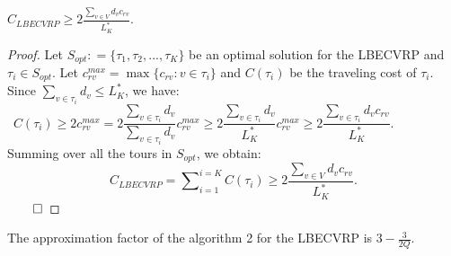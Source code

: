 \begin{lemma}
${C_{LBECVRP}} \ge 2\frac{{\sum\nolimits_{v \in V}^{} d_v c_{rv}}}{L_K^*}.$
\end{lemma}
\begin{proof}
\indent Let $S_{opt}: = \{ \tau _1,\tau _2,...,\tau _K\}$ be an optimal solution for the LBECVRP and $\tau_i \in S_{opt}$. Let $c_{rv}^{max} = \max \{c_{rv}:v \in {\tau_i}\} $ and $C({\tau_i})$ be the traveling cost of $\tau_i$. Since $\sum\nolimits_{v \in \tau_i} d_v \le L_K^*$, we have:
$$C(\tau_i) \ge 2c_{rv}^{max} = 2\frac{{\sum\nolimits_{v \in \tau_i} d_v }}{{\sum\nolimits_{v \in \tau_i} d_v }}c_{rv}^{max} \ge 2\frac{{\sum\nolimits_{v \in \tau_i} d_v }}{L_K^*} c_{rv}^{max} \ge 2\frac{\sum\nolimits_{v \in {\tau_i}} d_v c_{rv} }{L_K^*}.\hspace{2cm}$$
\noindent Summing over all the tours in $S_{opt}$, we obtain:
$${C_{LBECVRP}}=\sum\nolimits_{i=1}^{i=K} C( \tau_i) \ge 2\frac{\sum\nolimits_{v \in V}{d_v c_{rv}} }{L_K^*}. $$
$\qed$
\end{proof}
\begin{theorem}
The approximation factor of the algorithm 2 for the LBECVRP is $3-\frac{3}{2Q}$.
\end{theorem}
